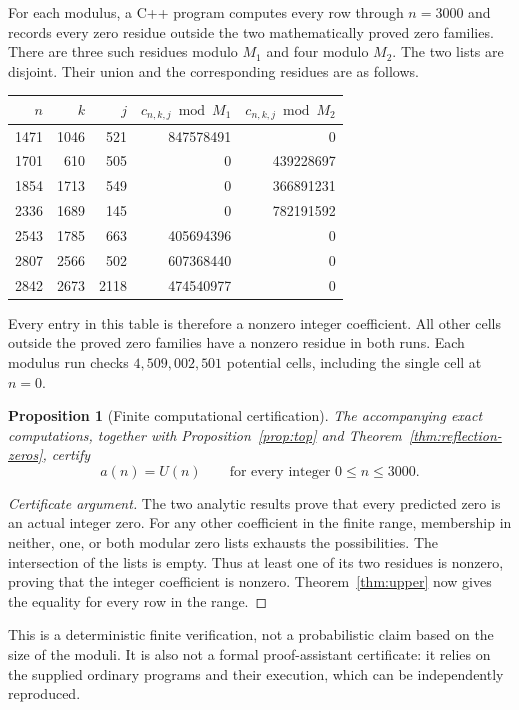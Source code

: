 \documentclass[11pt]{article}
\numberwithin{equation}{section}
\newtheorem{proposition}[theorem]{Proposition}
\theoremstyle{definition}
\theoremstyle{remark}
\newcommand{\U}{U}
\begin{document}
For each modulus, a C++ program computes every row through $n=3000$ and
records every zero residue outside the two mathematically proved zero
families. There are three such residues modulo $M_1$ and four modulo
$M_2$. The two lists are disjoint. Their union and the corresponding
residues are as follows.
\begin{center}
\small
\begin{tabular}{rrr|rr}
\toprule
$n$ & $k$ & $j$ & $c_{n,k,j}\bmod M_1$ & $c_{n,k,j}\bmod M_2$\\
\midrule
1471&1046&521&847578491&0\\
1701&610&505&0&439228697\\
1854&1713&549&0&366891231\\
2336&1689&145&0&782191592\\
2543&1785&663&405694396&0\\
2807&2566&502&607368440&0\\
2842&2673&2118&474540977&0\\
\bottomrule
\end{tabular}
\end{center}
Every entry in this table is therefore a nonzero integer coefficient.
All other cells outside the proved zero families have a nonzero residue
in both runs. Each modulus run checks $4{,}509{,}002{,}501$ potential
cells, including the single cell at $n=0$.

\begin{proposition}[Finite computational certification]\label{prop:finite}
The accompanying exact computations, together with
Proposition~\ref{prop:top} and Theorem~\ref{thm:reflection-zeros}, certify
\begin{equation}\label{eq:finite}
 a(n)=\U(n)\qquad\text{for every integer }0\le n\le3000.
\end{equation}
\end{proposition}
\begin{proof}[Certificate argument]
The two analytic results prove that every predicted zero is an actual
integer zero. For any other coefficient in the finite range, membership
in neither, one, or both modular zero lists exhausts the possibilities.
The intersection of the lists is empty. Thus at least one of its two
residues is nonzero, proving that the integer coefficient is nonzero.
Theorem~\ref{thm:upper} now gives the equality for every row in the range.
\end{proof}
This is a deterministic finite verification, not a probabilistic claim
based on the size of the moduli. It is also not a formal proof-assistant
certificate: it relies on the supplied ordinary programs and their
execution, which can be independently reproduced.
\end{document}
